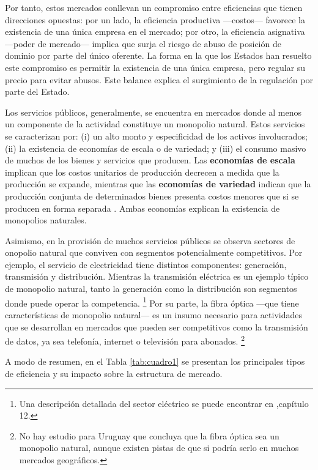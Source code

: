 \documentclass[
  12pt,
  spanish,
]{book}
\begin{document}
Por tanto, estos mercados conllevan un compromiso entre eficiencias que tienen direcciones opuestas: por un lado, la eficiencia productiva ---costos--- favorece la existencia de una única empresa en el mercado; por otro, la eficiencia asignativa ---poder de mercado--- implica que surja el riesgo de abuso de posición de dominio por parte del único oferente. La forma en la que los Estados han resuelto este compromiso es permitir la existencia de una única empresa, pero regular su precio para evitar abusos. Este balance explica el surgimiento de la regulación por parte del Estado.

Los servicios públicos, generalmente, se encuentra en mercados donde al menos un componente de la actividad constituye un monopolio natural. Estos servicios se caracterizan por: (i) un alto monto y especificidad de los activos involucrados; (ii) la existencia de economías de escala o de variedad; y (iii) el consumo masivo de muchos de los bienes y servicios que producen. Las \textbf{economías de escala} implican que los costos unitarios de producción decrecen a medida que la producción se expande, mientras que las \textbf{economías de variedad} indican que la producción conjunta de determinados bienes presenta costos menores que si se producen en forma separada \citep{Bergara2003}. Ambas economías explican la existencia de monopolios naturales.

Asimismo, en la provisión de muchos servicios públicos se observa sectores de onopolio natural que conviven con segmentos potencialmente competitivos. Por ejemplo, el servicio de electricidad tiene distintos componentes: generación, transmisión y distribución. Mientras la transmisión eléctrica es un ejemplo típico de monopolio natural, tanto la generación como la distribución son segmentos donde puede operar la competencia.
\footnote{Una descripción detallada del sector eléctrico se puede encontrar en \citet{Viscusi2005},capítulo 12.}
Por su parte, la fibra óptica ---que tiene características de monopolio natural--- es un insumo necesario para actividades que se desarrollan en mercados que pueden ser competitivos como la transmisión de datos, ya sea telefonía, internet o televisión para abonados.
\footnote{No hay estudio para Uruguay que concluya que la fibra óptica sea un monopolio natural, aunque existen pistas de que si podría serlo en muchos mercados geográficos.}

A modo de resumen, en el Tabla \ref{tab:cuadro1} se presentan los principales tipos de eficiencia y su impacto sobre la estructura de mercado.
\end{document}
